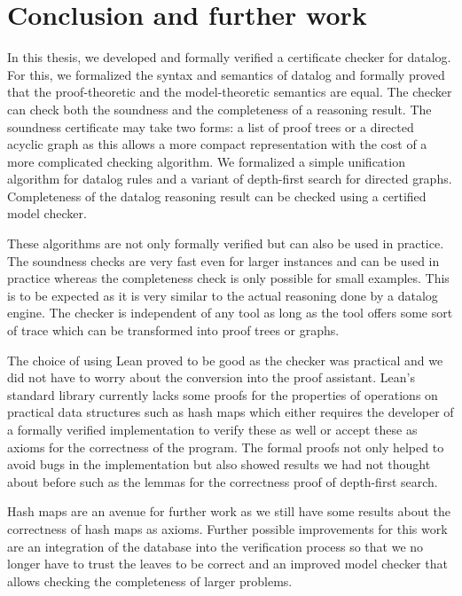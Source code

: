 \chapter{Conclusion and further work}

In this thesis, we developed and formally verified a certificate checker for datalog. For this, we formalized the syntax and semantics of datalog and formally proved that the proof-theoretic and the model-theoretic semantics are equal. The checker can check both the soundness and the completeness of a reasoning result. The soundness certificate may take two forms: a list of proof trees or a directed acyclic graph as this allows a more compact representation with the cost of a more complicated checking algorithm. We formalized a simple unification algorithm for datalog rules and a variant of depth-first search for directed graphs. Completeness of the datalog reasoning result can be checked using a certified model checker. 

These algorithms are not only formally verified but can also be used in practice. The soundness checks are very fast even for larger instances and can be used in practice whereas the completeness check is only possible for small examples. This is to be expected as it is very similar to the actual reasoning done by a datalog engine. The checker is independent of any tool as long as the tool offers some sort of trace which can be transformed into proof trees or graphs.

The choice of using Lean proved to be good as the checker was practical and we did not have to worry about the conversion into the proof assistant. Lean's standard library currently lacks some proofs for the properties of operations on practical data structures such as hash maps which either requires the developer of a formally verified implementation to verify these as well or accept these as axioms for the correctness of the program. The formal proofs not only helped to avoid bugs in the implementation but also showed results we had not thought about before such as the lemmas for the correctness proof of depth-first search.

Hash maps are an avenue for further work as we still have some results about the correctness of hash maps as axioms. Further possible improvements for this work are an integration of the database into the verification process so that we no longer have to trust the leaves to be correct and an improved model checker that allows checking the completeness of larger problems.

